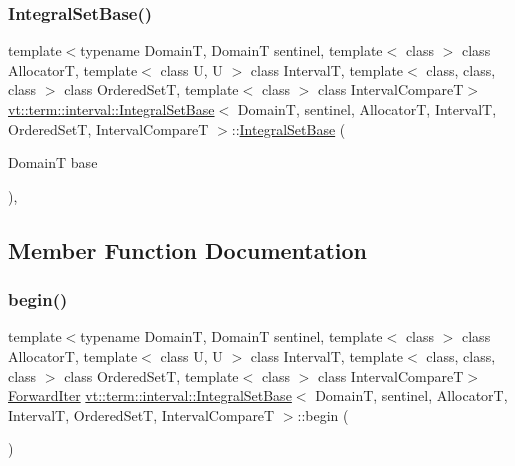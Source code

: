 \subsubsection{\texorpdfstring{Integral\+Set\+Base()}{IntegralSetBase()}\hspace{0.1cm}{\footnotesize\ttfamily [4/4]}}
{\footnotesize\ttfamily template$<$typename DomainT, DomainT sentinel, template$<$ class $>$ class AllocatorT, template$<$ class U, U $>$ class IntervalT, template$<$ class, class, class $>$ class Ordered\+SetT, template$<$ class $>$ class Interval\+CompareT$>$ \\
\hyperlink{structvt_1_1term_1_1interval_1_1_integral_set_base}{vt\+::term\+::interval\+::\+Integral\+Set\+Base}$<$ DomainT, sentinel, AllocatorT, IntervalT, Ordered\+SetT, Interval\+CompareT $>$\+::\hyperlink{structvt_1_1term_1_1interval_1_1_integral_set_base}{Integral\+Set\+Base} (\begin{DoxyParamCaption}\item[{DomainT}]{base }\end{DoxyParamCaption})\hspace{0.3cm}{\ttfamily [inline]}, {\ttfamily [explicit]}}



\subsection{Member Function Documentation}
\mbox{\label{structvt_1_1term_1_1interval_1_1_integral_set_base_a23d95f362bdc1094ae5f7f293771465a}} 
\subsubsection{\texorpdfstring{begin()}{begin()}}
{\footnotesize\ttfamily template$<$typename DomainT, DomainT sentinel, template$<$ class $>$ class AllocatorT, template$<$ class U, U $>$ class IntervalT, template$<$ class, class, class $>$ class Ordered\+SetT, template$<$ class $>$ class Interval\+CompareT$>$ \\
\hyperlink{structvt_1_1term_1_1interval_1_1_integral_set_base_abd0d7f40a96384d2db0a2782a8921a34}{Forward\+Iter} \hyperlink{structvt_1_1term_1_1interval_1_1_integral_set_base}{vt\+::term\+::interval\+::\+Integral\+Set\+Base}$<$ DomainT, sentinel, AllocatorT, IntervalT, Ordered\+SetT, Interval\+CompareT $>$\+::begin (\begin{DoxyParamCaption}{ }\end{DoxyParamCaption})\hspace{0.3cm}{\ttfamily [inline]}}

